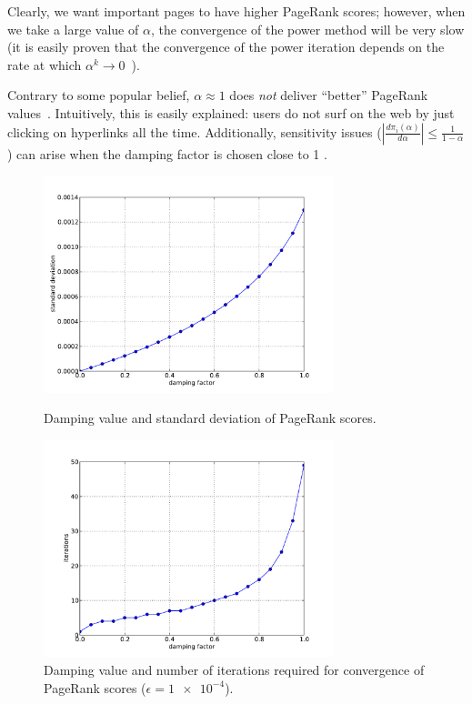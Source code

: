 \documentclass[a4paper,english,11pt]{scrartcl}
\begin{document}
Clearly, we want important pages to have higher PageRank scores; however, when we take a large value of $\alpha$, the convergence of the power method will be very slow (it is easily proven that the convergence of the power iteration depends on the rate at which $\alpha^k\rightarrow0$~\cite{function,Langville:2006:GPB:1146372}). 

Contrary to some popular belief, $\alpha\approx1$ does \emph{not} deliver ``better'' PageRank values~\cite{function}. Intuitively, this is easily explained: users do not surf on the web by just clicking on hyperlinks all the time.
Additionally, sensitivity issues ($
 |\frac{d\pi_i(\alpha)}{d\alpha} | \leq \frac{1}{1-\alpha}
$) can arise when the damping factor is chosen close to 1 \cite{function,Langville:2006:GPB:1146372}.

\begin{figure}[Hhbpt] \centering
 \includegraphics[width=0.75\textwidth]{standard_deviation}
 \caption{Damping value and standard deviation of PageRank scores. \label{fig:std}}

 \includegraphics[width=0.75\textwidth]{iterations}
 \caption{Damping value and number of iterations required for convergence of PageRank scores ($\epsilon=\num{1e-4}$). \label{fig:iterations}}
\end{figure}
\end{document}
